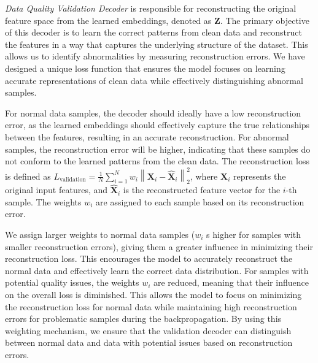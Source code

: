 {\textit{Data Quality Validation Decoder} is responsible for reconstructing the original feature space from the learned embeddings, denoted as \(\mathbf{Z}\). 
The primary objective of this decoder is to learn the correct patterns from clean data and reconstruct the features in a way that captures the underlying structure of the dataset. This allows us to identify abnormalities by measuring reconstruction errors. We have designed a unique loss function that ensures the model focuses on learning accurate representations of clean data while effectively distinguishing abnormal samples.

For normal data samples, the decoder should ideally have a low reconstruction error, as the learned embeddings should effectively capture the true relationships between the features, resulting in an accurate reconstruction. For abnormal samples, the reconstruction error will be higher, indicating that these samples do not conform to the learned patterns from the clean data.
The reconstruction loss is defined as 
\( L_{\text{validation}} = \frac{1}{N} \sum_{i=1}^{N} w_i \left\| \mathbf{X}_i - \hat{\mathbf{X}}_i \right\|_2^2 \),
where \(\mathbf{X}_i\) represents the original input features, and \(\hat{\mathbf{X}}_i\) is the reconstructed feature vector for the \(i\)-th sample. The weights \(w_i\) are assigned to each sample based on its reconstruction error.

We assign larger weights to normal data samples (\(w_i\) s higher for samples with smaller reconstruction errors), giving them a greater influence in minimizing their reconstruction loss. This encourages the model to accurately reconstruct the normal data and effectively learn the correct data distribution. 
For samples with potential quality issues, the weights \(w_i\) are reduced, meaning that their influence on the overall loss is diminished. 
This allows the model to focus on minimizing the reconstruction loss for normal data while maintaining high reconstruction errors for problematic samples during the backpropagation. 
By using this weighting mechanism, we ensure that the validation decoder can distinguish between normal data and data with potential issues based on reconstruction errors.


}
